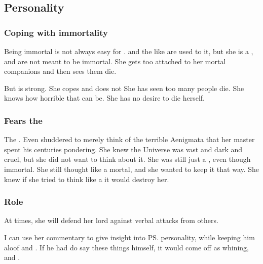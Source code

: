 \subsection{Personality}





\subsubsection{Coping with immortality}
Being immortal is not always easy for \Criseis. 
\Dragons{} and the like are used to it, but she is a \scatha, and \scathae{} are not meant to be immortal. 
She gets too attached to her mortal companions and then sees them die. 

But \Criseis{} is strong. 
She copes and does not 
She has seen too many people die. 
She knows how horrible that can be. 
She has no desire to die herself. 





\subsubsection{Fears the \dragons}
The \dragons {}. 
Even \Criseis shuddered to merely think of the terrible Aenigmata that her master spent his centuries pondering.
She knew the Universe was vast and dark and cruel, but she did not want to think about it.
She was still just a \scatha, even though immortal.
She still thought like a mortal, and she wanted to keep it that way.
She knew if she tried to think like a \dragon it would destroy her.





\subsubsection{Role}
At times, she will defend her lord against verbal attacks from others.  

I can use her commentary to give insight into \ps{\Ishnaruchaefir} personality, while keeping him aloof and . If he had do say these things himself, it would come off as whining,  and . 

